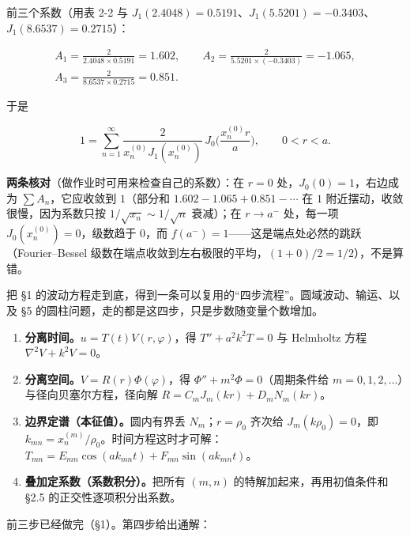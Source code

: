 \documentclass[11pt]{ctexart}
\let\origsubhdr\subhdr
\renewcommand{\subhdr}[1]{\par\needspace{3\baselineskip}\origsubhdr{#1}}
\let\orighdr\hdr
\renewcommand{\hdr}[2]{\par\needspace{6\baselineskip}\orighdr{#1}{#2}}
\begin{document}
前三个系数（用表 2-2 与 $J_1(2.4048)=0.5191$、$J_1(5.5201)=-0.3403$、$J_1(8.6537)=0.2715$）：

\begin{gather*}
A_1=\frac{2}{2.4048\times0.5191}=1.602,\qquad
A_2=\frac{2}{5.5201\times(-0.3403)}=-1.065,\\
A_3=\frac{2}{8.6537\times0.2715}=0.851 .
\end{gather*}

于是

\[
1=\sum_{n=1}^{\infty}\frac{2}{x_n^{(0)}J_1(x_n^{(0)})}\,J_0\Big(\frac{x_n^{(0)}r}{a}\Big),\qquad 0<r<a .
\]

\textbf{两条核对}（做作业时可用来检查自己的系数）：在 $r=0$ 处，$J_0(0)=1$，右边成为 $\sum A_n$，它应收敛到 $1$（部分和 $1.602-1.065+0.851-\cdots$ 在 $1$ 附近摆动，收敛很慢，因为系数只按 $1/\sqrt{x_n}\sim1/\sqrt n$ 衰减）；在 $r\to a^-$ 处，每一项 $J_0(x_n^{(0)})=0$，级数趋于 $0$，而 $f(a^-)=1$——这是端点处必然的跳跃（Fourier--Bessel 级数在端点收敛到左右极限的平均，$(1+0)/2=1/2$），不是算错。

\label{sec:s3}

把 \S1 的波动方程走到底，得到一条可以复用的“四步流程”。圆域波动、输运、以及 \S5 的圆柱问题，走的都是这四步，只是步数随变量个数增加。


\begin{enumerate}[label=\textbf{第 \arabic* 步}]
  \item \textbf{分离时间。}$u=T(t)V(r,\varphi)$，得 $T''+a^2k^2T=0$ 与 Helmholtz 方程 $\nabla^2V+k^2V=0$。
  \item \textbf{分离空间。}$V=R(r)\Phi(\varphi)$，得 $\Phi''+m^2\Phi=0$（周期条件给 $m=0,1,2,\dots$）与径向贝塞尔方程，径向解 $R=C_mJ_m(kr)+D_mN_m(kr)$。
  \item \textbf{边界定谱（本征值）。}圆内有界丢 $N_m$；$r=\rho_0$ 齐次给 $J_m(k\rho_0)=0$，即 $k_{mn}=x_n^{(m)}/\rho_0$。时间方程这时才可解：$T_{mn}=E_{mn}\cos(a k_{mn}t)+F_{mn}\sin(a k_{mn}t)$。
  \item \textbf{叠加定系数（系数积分）。}把所有 $(m,n)$ 的特解加起来，再用初值条件和 \S2.5 的正交性逐项积分出系数。
\end{enumerate}

前三步已经做完（\S1）。第四步给出通解：
\end{document}

